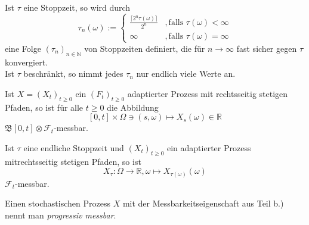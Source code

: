\documentclass[a4paper,twoside,DIV15,BCOR12mm]{scrbook}
\newcommand{\cF}{\mathcal F}
\newcommand{\borel}{{\mathfrak B}}
\begin{document}
\begin{lemma}
\label{lemma:13.1}
  \begin{enuma}
  \item Ist $\tau$ eine Stoppzeit, so wird durch
\[
\tau_n(\omega):=\left\{\begin{array}{cc}\frac{\lceil2^n\tau(\omega)\rceil}{2^n} &,\text{falls } \tau(\omega)<\infty \\ \infty &,\text{falls } \tau(\omega)=\infty\end{array}\right.
\]
eine Folge $(\tau_n)_{n\in\mathbb N}$ von Stoppzeiten definiert, die für $n\to\infty$ fast sicher gegen $\tau$ konvergiert. \\
Ist $\tau$ beschränkt, so nimmt jedes $\tau_n$ nur endlich viele Werte an.
\item Ist $X=(X_t)_{t\geq0}$ ein $(F_t)_{t\geq0}$ adaptierter Prozess mit rechtsseitig stetigen Pfaden, so ist für alle $t\geq0$ die Abbildung
\[
[0,t]\times\Omega\ni(s,\omega)\mapsto X_s(\omega)\in\mathbb R
\]
$\borel[0,t]\otimes\cF_t$-messbar.
\item Ist $\tau$ eine endliche Stoppzeit und $(X_t)_{t\geq0}$ ein adaptierter Prozess mitrechtsseitig stetigen Pfaden, so ist
\[
X_\tau:\Omega\longrightarrow\mathbb R, \omega\mapsto X_{\tau(\omega)}(\omega)
\]
$\cF_t$-messbar.
  \end{enuma}
\end{lemma}
\begin{bemerkung}
  Einen stochastischen Prozess $X$ mit der Messbarkeitseigenschaft aus Teil b.) nennt man \emph{progressiv messbar}.
\end{bemerkung}
\end{document}

